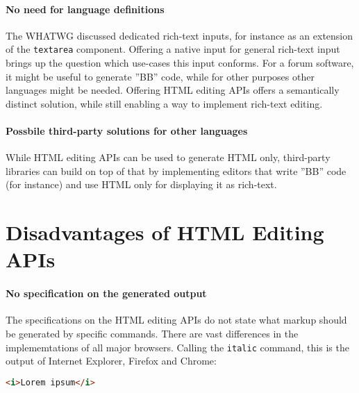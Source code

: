 \paragraph{No need for language definitions}

The WHATWG discussed dedicated rich-text inputs, for instance as an extension of the \texttt{textarea} component. Offering a native input for general rich-text input brings up the question which use-cases this input conforms. For a forum software, it might be useful to generate ''BB'' code, while for other purposes other languages might be needed. Offering HTML editing APIs offers a semantically distinct solution, while still enabling a way to implement rich-text editing. %

\paragraph{Possbile third-party solutions for other languages}

While HTML editing APIs can be used to generate HTML only, third-party libraries can build on top of that by implementing editors that write ''BB'' code (for instance) and use HTML only for displaying it as rich-text.

\section{Disadvantages of HTML Editing APIs}

\paragraph{No specification on the generated output}

The specifications on the HTML editing APIs do not state what markup should be generated by specific commands. There are vast differences in the implememtations of all major browsers. Calling the \texttt{italic} command, this is the output of Internet Explorer, Firefox and Chrome:

\begin{lstlisting}[language=html, caption=Markup of italic command in Internet Explorer, label=lst:italic-ie]
<i>Lorem ipsum</i>
\end{lstlisting}

